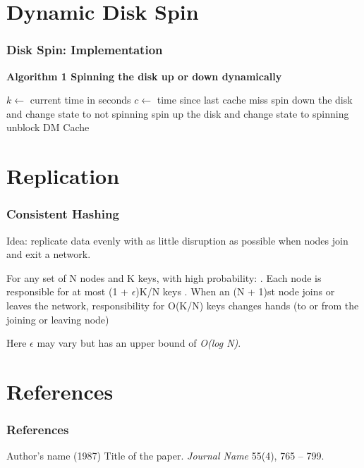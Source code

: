 \documentclass{beamer}
\begin{document}
\section{Dynamic Disk Spin}
\begin{frame}
\frametitle{Disk Spin: Implementation}
\bf Algorithm 1 \rm Spinning the disk up or down dynamically
\begin{algorithmic}[1]
  \State $k\gets$ current time in seconds
  \State $c\gets$ time since last cache miss
   \State spin down the disk and change state to not spinning
  \EndIf
 \Else {}
   \State spin up the disk and change state to spinning
   \State unblock DM Cache
  \EndIf
 \EndIf
\EndWhile
\EndProcedure
\end{algorithmic}
\end{frame}
%
\section{Replication}
\begin{frame}
\frametitle{Consistent Hashing}
Idea: replicate data evenly with as little disruption
as possible when nodes join and exit a network. \\
\begin{theorem}
For any set of N nodes and K keys, with high probability:
\newline{}. Each node is responsible for at most (1 + $\epsilon$)K/N keys
\newline{}. When an (N + 1)st node joins or leaves the network,
   responsibility for O(K/N) keys changes hands (to or from
   the joining or leaving node)
\end{theorem}
Here $\epsilon$ may vary but has an upper bound of \textit{O(log N)}.
\end{frame}
%
%
%
%
%
%
\section{References}
\begin{frame}
\frametitle{References}
\footnotesize {
\begin{thebibliography}{99}
  Author's name (1987)
 \newblock Title of the paper.
 \newblock \emph{Journal Name} 55(4), 765 -- 799.
\end{thebibliography}
}
\end{frame}
%
\end{document}

